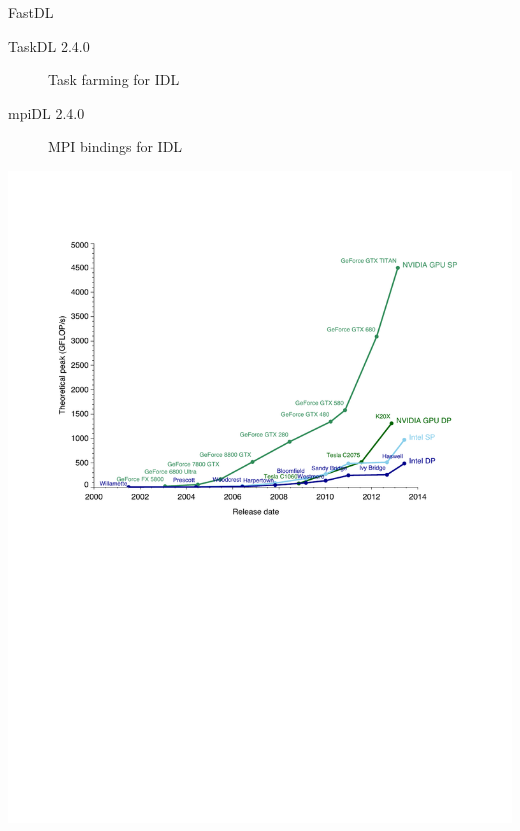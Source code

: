 \documentclass[12pt, handout]{beamer}
\begin{document}
\begin{frame}[t]{FastDL}
\begin{description}
  \item[TaskDL 2.4.0] Task farming for IDL
  \item[mpiDL 2.4.0] MPI bindings for IDL
\end{description}
\vspace{-2.25em}
\begin{center}
  \includegraphics[scale=0.4]{cpu-vs-gpu.pdf}
\end{center}
\end{frame}
\end{document}
